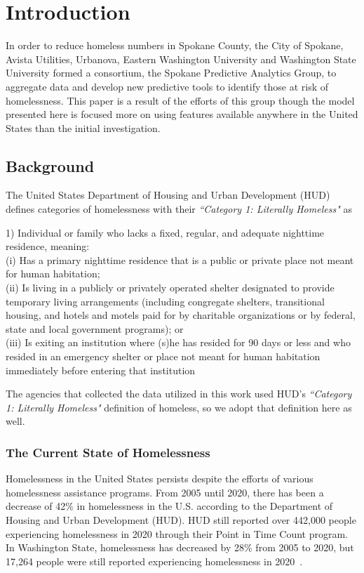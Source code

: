 \documentclass[10pt,letterpaper]{article}
\begin{document}
\section*{Introduction}
In order to reduce homeless numbers in Spokane County, the City of Spokane, Avista Utilities, Urbanova, Eastern Washington University and Washington State University formed a consortium, the Spokane Predictive Analytics Group, to aggregate data and develop new predictive tools to identify those at risk of homelessness. This paper is a result of the efforts of this group though the model presented here is focused more on using features available anywhere in the United States than the initial investigation.

\subsection*{Background}
The United States Department of Housing and Urban Development (HUD) defines categories of homelessness with their \textit{``Category 1: Literally Homeless"} as
\begin{displayquote}
1) Individual or family who lacks a fixed, regular, and adequate nighttime residence, meaning: \\
(i) Has a primary nighttime residence that is a public or private place not meant for human habitation; \\
(ii) Is living in a publicly or privately operated shelter designated to provide temporary living arrangements (including congregate shelters, transitional housing, and hotels and motels paid for by charitable organizations or by federal, state and local government programs); or \\
(iii) Is exiting an institution where (s)he has resided for 90 days or less and who resided in an emergency shelter or place not meant for human habitation immediately before entering that institution
\end{displayquote}

The agencies that collected the data utilized in this work used HUD's \textit{``Category 1: Literally Homeless"} definition of homeless, so we adopt that definition here as well.

\subsubsection*{The Current State of Homelessness}
Homelessness in the United States persists despite the efforts of various homelessness assistance programs. From 2005 until 2020, there has been a decrease of 42\% in homelessness in the U.S. according to the Department of Housing and Urban Development (HUD). HUD still reported over 442,000 people experiencing homelessness in 2020 through their Point in Time Count program. In Washington State, homelessness has decreased by 28\% from 2005 to 2020, but 17,264 people were still reported experiencing homelessness in 2020~\cite{PITcount}.
\end{document}
